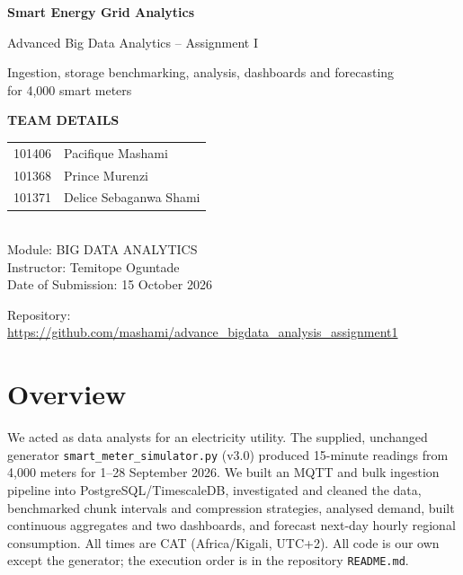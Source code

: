 \documentclass[11pt,a4paper]{article}
\newcommand{\submissiondate}{15 October 2026}
\begin{document}
\begin{titlepage}
\centering
\vspace*{2.5cm}
{\Huge\bfseries Smart Energy Grid Analytics\par}
\vspace{0.4cm}
{\Large Advanced Big Data Analytics -- Assignment I\par}
\vspace{0.3cm}
{\large Ingestion, storage benchmarking, analysis, dashboards and forecasting\\
for 4,000 smart meters\par}
\vspace{2.2cm}

\begin{tcolorbox}[colback=teambg, colframe=teamframe, boxrule=0.6pt, arc=0pt,
                  width=0.9\linewidth, halign=center, top=10pt, bottom=10pt]
{\large\bfseries\color{teamtitle} TEAM DETAILS}\\[8pt]
\begin{tabular}{ll}
101406 & Pacifique Mashami\\
101368 & Prince Murenzi\\
101371 & Delice Sebaganwa Shami\\
\end{tabular}\\[10pt]
Module: BIG DATA ANALYTICS\\[6pt]
Instructor: Temitope Oguntade \\[6pt]
Date of Submission: \submissiondate
\end{tcolorbox}

\vfill
{\small Repository: \url{https://github.com/mashami/advance_bigdata_analysis_assignment1}}
\end{titlepage}

\tableofcontents
\newpage

\section*{Overview}
We acted as data analysts for an electricity utility. The supplied, unchanged
generator \texttt{smart\_meter\_simulator.py} (v3.0) produced 15-minute readings
from 4,000 meters for 1--28 September 2026. We built an MQTT and bulk ingestion
pipeline into PostgreSQL/TimescaleDB, investigated and cleaned the data,
benchmarked chunk intervals and compression strategies, analysed demand, built
continuous aggregates and two dashboards, and forecast next-day hourly regional
consumption. All times are CAT (Africa/Kigali, UTC+2). All code is our own except
the generator; the execution order is in the repository \texttt{README.md}.
\end{document}
